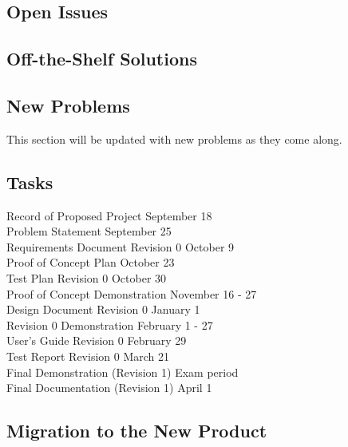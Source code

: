 \documentclass[12pt]{article}
\begin{document}
\subsection{Open Issues} %

\subsection{Off-the-Shelf Solutions} %

\subsection{New Problems} %
This section will be updated with new problems as they come along.

\subsection{Tasks}\label{SubSec_Tasks} %
Record of Proposed Project \hfill September 18\\
Problem Statement \hfill September 25\\
Requirements Document Revision 0 \hfill	October 9\\
Proof of Concept Plan \hfill October 23\\
Test Plan Revision 0 \hfill	October 30\\
Proof of Concept Demonstration \hfill November 16 - 27\\
Design Document Revision 0 \hfill January 1\\
Revision 0 Demonstration \hfill	February 1 -  27\\
User's Guide Revision 0	\hfill February 29\\
Test Report Revision 0 \hfill March 21\\
Final Demonstration (Revision 1) \hfill	Exam period\\
Final Documentation (Revision 1) \hfill	April 1

\subsection{Migration to the New Product} %

\end{document}
